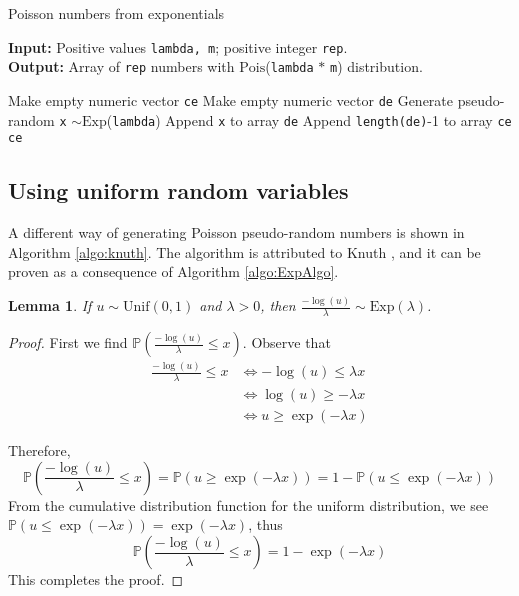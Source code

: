 \documentclass[letterpaper, 10 pt, conference]{article}
\renewcommand{\P}{\ensuremath{\mathbb{P}}} %
\renewcommand{\iff}{\ensuremath{\Leftrightarrow}} %
\newtheorem{lemma}{Lemma}
\begin{document}
\begin{algorithm}
	\caption{Poisson numbers from exponentials}
	\begin{flushleft}
		\textbf{Input: } Positive values \texttt{lambda, m}; positive integer \texttt{rep}.
		\\ \textbf{Output: } Array of \texttt{rep} numbers with $\mathrm{Pois}$(\texttt{lambda} $\ast$ \texttt{m}) distribution.
	\end{flushleft}
	
	\begin{algorithmic}[1]
		\State Make empty numeric vector \texttt{ce}
		\State Make empty numeric vector \texttt{de}
		\State Generate pseudo-random \texttt{x} $\sim \mathrm{Exp}$(\texttt{lambda})
		\State Append \texttt{x} to array \texttt{de}
		\EndWhile
		\State Append \texttt{length(de)}-1 to array \texttt{ce}
		\EndFor
		\State \Return \texttt{ce}
	\end{algorithmic}
	\label{algo:ExpAlgo}
\end{algorithm}

\subsection{Using uniform random variables}
A different way of generating Poisson pseudo-random numbers is shown in Algorithm \ref{algo:knuth}. The algorithm is attributed to Knuth \cite{Knuth_1997}, and it can be proven as a consequence of Algorithm \ref{algo:ExpAlgo}. 

\begin{lemma}\label{lemma}
If $u \sim \mathrm{Unif}(0,1)$ and $\lambda > 0$, then $\frac{-\log(u)}{\lambda} \sim \mathrm{Exp}(\lambda)$.
\end{lemma}

\begin{proof}
First we find $\P\left(\frac{-\log(u)}{\lambda} \leq x\right)$. Observe that
\begin{align}
\frac{-\log(u)}{\lambda} \leq x &\iff -\log(u) \leq \lambda x\\
 &\iff \log(u) \geq -\lambda x\\
 &\iff u \geq \exp(-\lambda x)
\end{align}

Therefore, 
\begin{equation}
\P\left(\frac{-\log(u)}{\lambda} \leq x\right) = \P\left( u \geq \exp(-\lambda x) \right) = 1 - \P\left(u \leq \exp(-\lambda x)\right)
\end{equation}
From the cumulative distribution function for the uniform distribution, we see $\P\left(u \leq \exp(-\lambda x)\right) = \exp(-\lambda x)$, thus 
\begin{equation}
\P\left(\frac{-\log(u)}{\lambda} \leq x\right) = 1 - \exp(-\lambda x)
\end{equation}
This completes the proof.
\end{proof}
\end{document}
